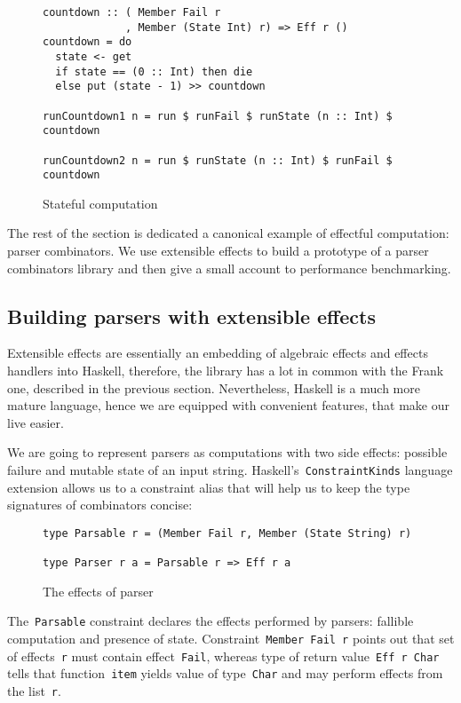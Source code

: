     \begin{figure}[h]
    \begin{lstlisting}
countdown :: ( Member Fail r
             , Member (State Int) r) => Eff r ()
countdown = do
  state <- get
  if state == (0 :: Int) then die
  else put (state - 1) >> countdown

runCountdown1 n = run $ runFail $ runState (n :: Int) $ countdown

runCountdown2 n = run $ runState (n :: Int) $ runFail $ countdown
    \end{lstlisting}
    \caption{Stateful computation}
    \label{listing:ExtEffCountdown}
    \end{figure}

    The rest of the section is dedicated a canonical example of effectful computation:
    parser combinators. We use extensible effects to build a prototype of a parser combinators
    library and then give a small account to performance benchmarking.

    \subsection{Building parsers with extensible effects}

      Extensible effects are essentially an embedding of algebraic effects and effects handlers
      into Haskell, therefore, the library has a lot in common with the Frank one, described
      in the previous section. Nevertheless, Haskell is a much more mature language, hence
      we are equipped with convenient features, that make our live easier.

      We are going to represent parsers as computations with two side effects: possible failure
      and mutable state of an input string.
      Haskell's~\texttt{ConstraintKinds} language extension allows us to
      a constraint alias that will help us to keep the type signatures of combinators concise:

      \begin{figure}[h]
      \begin{lstlisting}
type Parsable r = (Member Fail r, Member (State String) r)

type Parser r a = Parsable r => Eff r a
      \end{lstlisting}
      \caption{The effects of parser}
      \label{listing:ExtEffCountdown}
      \end{figure}

      The~\texttt{Parsable} constraint declares the effects performed by parsers:
      fallible computation and presence of state. Constraint~\texttt{Member Fail r} points out that set of effects~\texttt{r} must contain effect~\texttt{Fail}, whereas type of return
      value~\texttt{Eff r Char} tells that function~\texttt{item} yields value
      of type~\texttt{Char} and may perform effects from the list~\texttt{r}.

